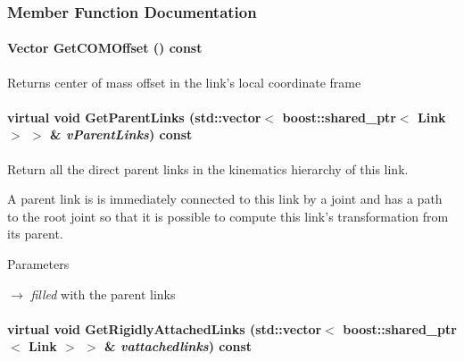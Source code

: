 \subsubsection{Member Function Documentation}
\hypertarget{classOpenRAVE_1_1KinBody_1_1Link_a2e9a0c247f0f9d1c47b78a745268a98e}{
\paragraph[{GetCOMOffset}]{\setlength{\rightskip}{0pt plus 5cm}Vector GetCOMOffset () const}\hfill}
\label{classOpenRAVE_1_1KinBody_1_1Link_a2e9a0c247f0f9d1c47b78a745268a98e}
\begin{DoxyReturn}{Returns}
center of mass offset in the link's local coordinate frame 
\end{DoxyReturn}
\hypertarget{classOpenRAVE_1_1KinBody_1_1Link_a975b50117973af79adde0411409e1cea}{
\paragraph[{GetParentLinks}]{\setlength{\rightskip}{0pt plus 5cm}virtual void GetParentLinks (std::vector$<$ boost::shared\_\-ptr$<$ {\bf Link} $>$ $>$ \& {\em vParentLinks}) const}\hfill}
\label{classOpenRAVE_1_1KinBody_1_1Link_a975b50117973af79adde0411409e1cea}


Return all the direct parent links in the kinematics hierarchy of this link. 

A parent link is is immediately connected to this link by a joint and has a path to the root joint so that it is possible to compute this link's transformation from its parent. 
\begin{DoxyParams}{Parameters}
\item[\mbox{$\rightarrow$} {\em filled}]with the parent links \end{DoxyParams}
\hypertarget{classOpenRAVE_1_1KinBody_1_1Link_a1452271a9a62d59785c04764543f94d7}{
\paragraph[{GetRigidlyAttachedLinks}]{\setlength{\rightskip}{0pt plus 5cm}virtual void GetRigidlyAttachedLinks (std::vector$<$ boost::shared\_\-ptr$<$ {\bf Link} $>$ $>$ \& {\em vattachedlinks}) const}\hfill}
\label{classOpenRAVE_1_1KinBody_1_1Link_a1452271a9a62d59785c04764543f94d7}


